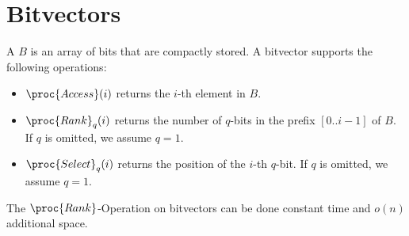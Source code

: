 \section{Bitvectors}

\begin{Definition}
  A  $B$ is an array of bits that are compactly stored. A bitvector supports the following operations:
  \begin{itemize}
    \item $\proc{Access}(i)$ returns the $i$-th element in $B$.
    \item $\proc{Rank}_q(i)$ returns the number of $q$-bits in the prefix $[0..i-1]$ of $B$. If $q$ is omitted, we assume $q = 1$.
    \item $\proc{Select}_q(i)$ returns the position of the $i$-th $q$-bit. If $q$ is omitted, we assume $q = 1$.
  \end{itemize}
\end{Definition}

\begin{Theorem}
  \label{thm:bitvectorRank}
  The $\proc{Rank}$-Operation on bitvectors can be done constant time and $o(n)$ additional space.\cite{Jacobson1989}
\end{Theorem}

